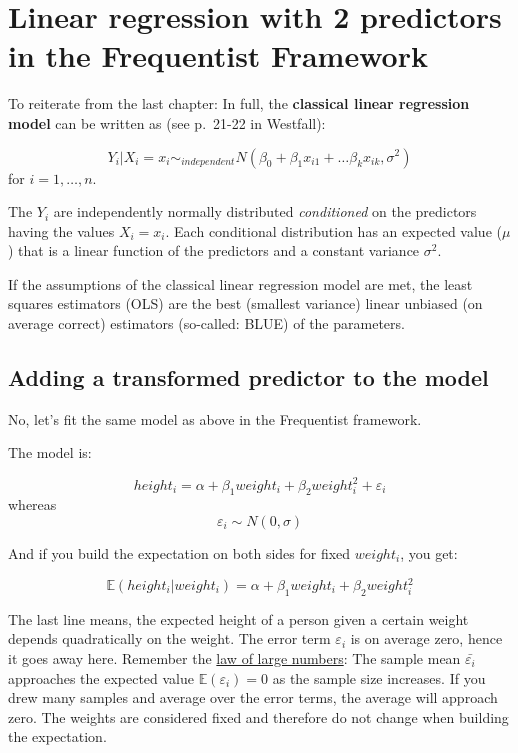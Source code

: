 \documentclass[
]{book}
\begin{document}
\section{Linear regression with 2 predictors in the Frequentist Framework}\label{linear-regression-with-2-predictors-in-the-frequentist-framework}

To reiterate from the last chapter:
In full, the \textbf{classical linear regression model} can be written as
(see p.~21-22 in Westfall):

\[ Y_i|X_i = x_i \sim_{independent} N(\beta_0 + \beta_1 x_{i1} + \dots \beta_k x_{ik},\sigma^2)\]
for \(i = 1, \dots, n\).

The \(Y_i\) are independently normally distributed \emph{conditioned} on the predictors
having the values \(X_i = x_i\). Each conditional distribution has an expected value (\(\mu\))
that is a linear function of the predictors and a constant variance \(\sigma^2\).

If the assumptions of the classical linear regression model are met, the least squares
estimators (OLS) are the best (smallest variance) linear unbiased (on average correct) estimators
(so-called: BLUE) of the parameters.

\subsection{Adding a transformed predictor to the model}\label{adding_transformed_predictor_freq}

No, let's fit the same model as above in the Frequentist framework.

The model is:

\[height_i = \alpha + \beta_1 weight_i + \beta_2 weight_i^2 + \varepsilon_i\]
whereas
\[\varepsilon_i \sim N(0, \sigma)\]

And if you build the expectation on both sides for fixed \(weight_i\), you get:

\[\mathbb{E}(height_i|weight_i) = \alpha + \beta_1 weight_i + \beta_2 weight_i^2\]

The last line means, the expected height of a person given a certain weight depends
quadratically on the weight. The error term \(\varepsilon_i\) is on average zero, hence it goes away here.
Remember the \href{https://en.wikipedia.org/wiki/Law_of_large_numbers\#Weak_law}{law of large numbers}:
The sample mean \(\bar{\varepsilon_i}\) approaches the expected value \(\mathbb{E}(\varepsilon_i)=0\)
as the sample size increases. If you drew many samples and average over the error terms,
the average will approach zero.
The weights are considered fixed and therefore do not change when building the expectation.
\end{document}
